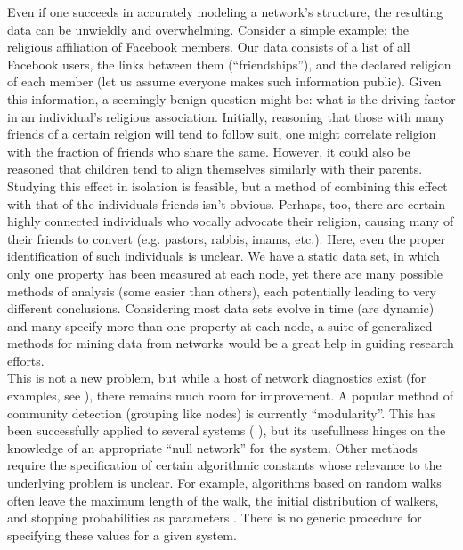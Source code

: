 \documentclass[11pt]{article}
\begin{document}
Even if one succeeds in accurately modeling a network's structure, the resulting data can be unwieldly and overwhelming. Consider a simple example: the religious affiliation of Facebook members. Our data consists of a list of all Facebook users, the links between them (``friendships''), and the declared religion of each member (let us assume everyone makes such information public). Given this information, a seemingly benign question might be: what is the driving factor in an individual's religious association. Initially, reasoning that those with many friends of a certain relgion will tend to follow suit, one might correlate religion with the fraction of friends who share the same. However, it could also be reasoned that children tend to align themselves similarly with their parents. Studying this effect in isolation is feasible, but a method of combining this effect with that of the individuals friends isn't obvious. Perhaps, too, there are certain highly connected individuals who vocally advocate their religion, causing many of their friends to convert (e.g. pastors, rabbis, imams, etc.). Here, even the proper identification of such individuals is unclear. We have a static data set, in which only one property has been measured at each node, yet there are many possible methods of analysis (some easier than others), each potentially leading to very different conclusions. Considering most data sets evolve in time (are dynamic) and many specify more than one property at each node, a suite of generalized methods for mining data from networks would be a great help in guiding research efforts. \vspace{1mm}\\
This is not a new problem, but while a host of network diagnostics exist (for examples, see \cite{diffusion distances} \cite{clustering}), there remains much room for improvement. A popular method of community detection (grouping like nodes) is currently ``modularity''. This has been successfully applied to several systems (\cite{basset} \cite{more bassett}), but its usefullness hinges on the knowledge of an appropriate ``null network'' for the system. Other methods require the specification of certain algorithmic constants whose relevance to the underlying problem is unclear. For example, algorithms based on random walks often leave the maximum length of the walk, the initial distribution of walkers, and stopping probabilities as parameters \cite{japan_ibm_graph_kernels}. There is no generic procedure for specifying these values for a given system. \vspace{1mm}\\
\end{document}
